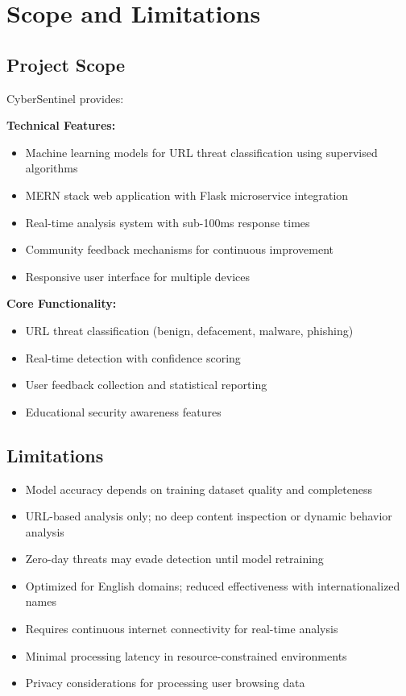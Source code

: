\section{Scope and Limitations}

\subsection{Project Scope}

CyberSentinel provides:

\textbf{Technical Features:}
\begin{itemize}
	\item Machine learning models for URL threat classification using supervised algorithms
	\item MERN stack web application with Flask microservice integration
	\item Real-time analysis system with sub-100ms response times
	\item Community feedback mechanisms for continuous improvement
	\item Responsive user interface for multiple devices
\end{itemize}

\textbf{Core Functionality:}
\begin{itemize}
	\item URL threat classification (benign, defacement, malware, phishing)
	\item Real-time detection with confidence scoring
	\item User feedback collection and statistical reporting
	\item Educational security awareness features
\end{itemize}

\subsection{Limitations}

\begin{itemize}
	\item Model accuracy depends on training dataset quality and completeness
	\item URL-based analysis only; no deep content inspection or dynamic behavior analysis
	\item Zero-day threats may evade detection until model retraining
	\item Optimized for English domains; reduced effectiveness with internationalized names
	\item Requires continuous internet connectivity for real-time analysis
	\item Minimal processing latency in resource-constrained environments
	\item Privacy considerations for processing user browsing data
\end{itemize}